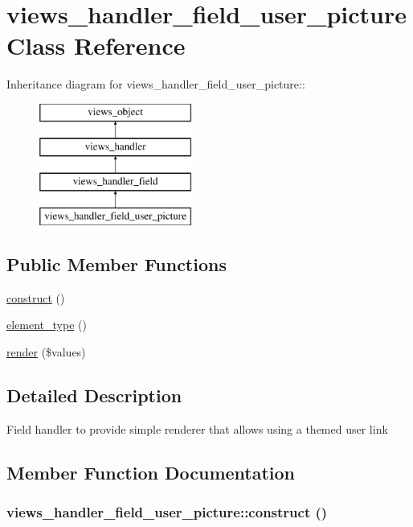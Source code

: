 \hypertarget{classviews__handler__field__user__picture}{
\section{views\_\-handler\_\-field\_\-user\_\-picture Class Reference}
\label{classviews__handler__field__user__picture}
}
Inheritance diagram for views\_\-handler\_\-field\_\-user\_\-picture::\begin{figure}[H]
\begin{center}
\leavevmode
\includegraphics[height=4cm]{classviews__handler__field__user__picture}
\end{center}
\end{figure}
\subsection*{Public Member Functions}
\begin{CompactItemize}
\item 
\hyperlink{classviews__handler__field__user__picture_65f7bf025afe7e60df88cfe9a72eaf4a}{construct} ()
\item 
\hyperlink{classviews__handler__field__user__picture_a489de4d3a5f1d5656bad62545ee81ec}{element\_\-type} ()
\item 
\hyperlink{classviews__handler__field__user__picture_707edb06f305fa88542f20cbfec36a04}{render} (\$values)
\end{CompactItemize}


\subsection{Detailed Description}
Field handler to provide simple renderer that allows using a themed user link 

\subsection{Member Function Documentation}
\hypertarget{classviews__handler__field__user__picture_65f7bf025afe7e60df88cfe9a72eaf4a}{
\subsubsection[{construct}]{\setlength{\rightskip}{0pt plus 5cm}views\_\-handler\_\-field\_\-user\_\-picture::construct ()}}
\label{classviews__handler__field__user__picture_65f7bf025afe7e60df88cfe9a72eaf4a}


